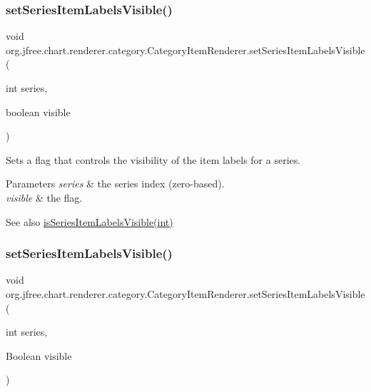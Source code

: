 \subsubsection{\texorpdfstring{set\+Series\+Item\+Labels\+Visible()}{setSeriesItemLabelsVisible()}\hspace{0.1cm}{\footnotesize\ttfamily [1/3]}}
{\footnotesize\ttfamily void org.\+jfree.\+chart.\+renderer.\+category.\+Category\+Item\+Renderer.\+set\+Series\+Item\+Labels\+Visible (\begin{DoxyParamCaption}\item[{int}]{series,  }\item[{boolean}]{visible }\end{DoxyParamCaption})}

Sets a flag that controls the visibility of the item labels for a series.


\begin{DoxyParams}{Parameters}
{\em series} & the series index (zero-\/based). \\
\hline
{\em visible} & the flag.\\
\hline
\end{DoxyParams}
\begin{DoxySeeAlso}{See also}
\mbox{\hyperlink{interfaceorg_1_1jfree_1_1chart_1_1renderer_1_1category_1_1_category_item_renderer_ab37b75d719d1386f107829cddf9eb1b2}{is\+Series\+Item\+Labels\+Visible(int)}} 
\end{DoxySeeAlso}
\mbox{\label{interfaceorg_1_1jfree_1_1chart_1_1renderer_1_1category_1_1_category_item_renderer_a123a2563ae40ed6a21ab4ace1c8c92ab}} 
\subsubsection{\texorpdfstring{set\+Series\+Item\+Labels\+Visible()}{setSeriesItemLabelsVisible()}\hspace{0.1cm}{\footnotesize\ttfamily [2/3]}}
{\footnotesize\ttfamily void org.\+jfree.\+chart.\+renderer.\+category.\+Category\+Item\+Renderer.\+set\+Series\+Item\+Labels\+Visible (\begin{DoxyParamCaption}\item[{int}]{series,  }\item[{Boolean}]{visible }\end{DoxyParamCaption})}

